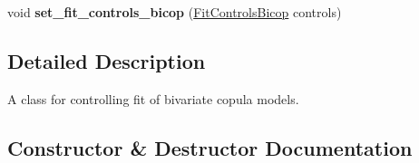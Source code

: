 \begin{DoxyCompactItemize}
\item 
void {\bfseries set\+\_\+fit\+\_\+controls\+\_\+bicop} (\hyperlink{classvinecopulib_1_1_fit_controls_bicop}{Fit\+Controls\+Bicop} controls)\hypertarget{classvinecopulib_1_1_fit_controls_vinecop_a6ed63d403dc902119ebe0252ada0be47}{}\label{classvinecopulib_1_1_fit_controls_vinecop_a6ed63d403dc902119ebe0252ada0be47}

\end{DoxyCompactItemize}



\subsection{Detailed Description}
A class for controlling fit of bivariate copula models. 

\subsection{Constructor \& Destructor Documentation}
